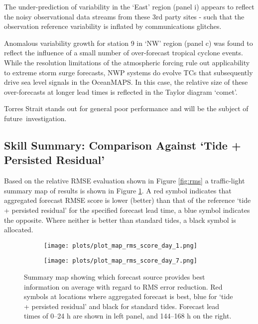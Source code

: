 The under-prediction of variability in the `East' region (panel i) appears to reflect the noisy observational data streams from these 3rd party sites - such that the observation reference variability is inflated by communications glitches.

Anomalous variability growth for station 9 in `NW' region (panel c) was found to reflect the influence of a small number of over-forecast tropical cyclone events.  While the resolution limitations of the atmospheric forcing rule out applicability to extreme storm surge forecasts, NWP systems do evolve TCs that subsequently drive sea level signals in the OceanMAPS. In this case, the relative size of these over-forecasts at longer lead times is reflected in the Taylor diagram `comet'.

Torres Strait stands out for general poor performance and will be the subject of future~investigation.



\subsection{Skill Summary: Comparison Against `Tide + Persisted Residual'}
Based on the relative RMSE evaluation shown in Figure \ref{fig:rms} a traffic-light summary map of results is shown in Figure \ref{fig:map_rms}.
A red symbol indicates that aggregated forecast RMSE score is lower (better) than that of the reference `tide + persisted residual' for the specified forecast lead time, a blue symbol indicates the opposite.  Where neither is better than standard tides, a black symbol is allocated.   
\begin{figure}[H]
    \centering
    \begin{subfigure}[b]{0.45\textwidth}
        \texttt{[image: plots/plot\_map\_rms\_score\_day\_1.png]}
    \end{subfigure}
    \begin{subfigure}[b]{0.45\textwidth}
        \texttt{[image: plots/plot\_map\_rms\_score\_day\_7.png]}
    \end{subfigure}
    \caption{ Summary map showing which forecast source provides best information on average with regard to RMS error reduction. Red symbols at locations where aggregated forecast is best, blue for `tide + persisted residual' and black for standard tides.  Forecast lead times of 0--24 h are shown in left panel, and 144--168 h on the right.}
    \label{fig:map_rms}\vspace{-3pt}
\end{figure}   



